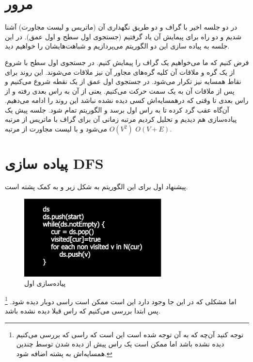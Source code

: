 \section{مرور}

در دو جلسه اخیر با گراف و دو طریق نگهداری آن (ماتریس و لیست مجاورت) آشنا شدیم و دو راه برای پیمایش آن یاد گرفتیم (جستجوی اول سطح و اول عمق). در این جلسه به پیاده سازی این دو الگوریتم می‌پردازیم و شباهت‌هایشان را خواهیم دید.

فرض کنیم که ما می‌خواهیم یک گراف را پیمایش کنیم. در جستجوی اول سطح با شروع از یک گره و ملاقات آن کلیه گره‌های مجاور آن نیز ملاقات می‌شوند. این روند برای نقاط همسایه نیز تکرار می‌شود. در جستجوی اول عمق از یک نقطه شروع می‌کنیم و پس از ملاقات آن به یک سمت حرکت می‌کنیم. یعنی از آن به راس بعدی رفته و از راس بعدی تا وقتی که درهمسایه‌اش کسی دیده‌ نشده نباشد این روند را ادامه می‌دهیم. آن‌گاه عقب‌ گرد کرده تا به راس اول برسد و الگوریتم تمام شود. جلسه پیش یک پیاده‌سازی هم دیدیم و تحلیل کردیم مرتبه زمانی آن برای گراف با ماتریس از مرتبه $O(V^2)$ می‌شود و با لیست مجاورت از مرتبه $O(V+E)$.

\section{پیاده سازی DFS}

پیشنهاد اول برای این الگوریتم به شکل زیر و به کمک پشته است. 

\begin{figure}[h!]
\centering
\includegraphics[width=75mm]{s1}
\caption{پیاده‌سازی اول}
\label{fig:first_impl}
\end{figure}

اما مشکلی که در این جا وجود دارد این است ممکن است راسی دوبار دیده شود.
\footnote{
توجه کنید آن‌چه که به آن توجه شده است این است که راسی که بررسی می‌کنیم دیده نشده باشد اما ممکن است یک راس پیش از دیده شدن توسط چندین همسایه‌اش به پشته اضافه شود.	
}
 پس ابتدا بررسی می‌کنیم که راس قبلا دیده نشده باشد.


